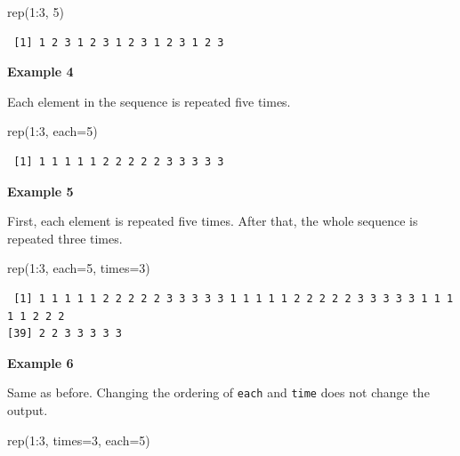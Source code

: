 \documentclass[
  letterpaper,
  DIV=11,
  numbers=noendperiod]{scrreprt}
\newenvironment{Shaded}{\begin{snugshade}}{\end{snugshade}}
\newcommand{\AttributeTok}[1]{\textcolor[rgb]{0.40,0.45,0.13}{#1}}
\newcommand{\DecValTok}[1]{\textcolor[rgb]{0.68,0.00,0.00}{#1}}
\newcommand{\FunctionTok}[1]{\textcolor[rgb]{0.28,0.35,0.67}{#1}}
\newcommand{\NormalTok}[1]{\textcolor[rgb]{0.00,0.23,0.31}{#1}}
\newcommand{\SpecialCharTok}[1]{\textcolor[rgb]{0.37,0.37,0.37}{#1}}
\begin{document}
\begin{Shaded}
\begin{Highlighting}[]
\FunctionTok{rep}\NormalTok{(}\DecValTok{1}\SpecialCharTok{:}\DecValTok{3}\NormalTok{, }\DecValTok{5}\NormalTok{)}
\end{Highlighting}
\end{Shaded}

\begin{verbatim}
 [1] 1 2 3 1 2 3 1 2 3 1 2 3 1 2 3
\end{verbatim}

\textbf{Example 4}

Each element in the sequence is repeated five times.

\begin{Shaded}
\begin{Highlighting}[]
\FunctionTok{rep}\NormalTok{(}\DecValTok{1}\SpecialCharTok{:}\DecValTok{3}\NormalTok{, }\AttributeTok{each=}\DecValTok{5}\NormalTok{)}
\end{Highlighting}
\end{Shaded}

\begin{verbatim}
 [1] 1 1 1 1 1 2 2 2 2 2 3 3 3 3 3
\end{verbatim}

\textbf{Example 5}

First, each element is repeated five times. After that, the whole
sequence is repeated three times.

\begin{Shaded}
\begin{Highlighting}[]
\FunctionTok{rep}\NormalTok{(}\DecValTok{1}\SpecialCharTok{:}\DecValTok{3}\NormalTok{, }\AttributeTok{each=}\DecValTok{5}\NormalTok{, }\AttributeTok{times=}\DecValTok{3}\NormalTok{)}
\end{Highlighting}
\end{Shaded}

\begin{verbatim}
 [1] 1 1 1 1 1 2 2 2 2 2 3 3 3 3 3 1 1 1 1 1 2 2 2 2 2 3 3 3 3 3 1 1 1 1 1 2 2 2
[39] 2 2 3 3 3 3 3
\end{verbatim}

\textbf{Example 6}

Same as before. Changing the ordering of \texttt{each} and \texttt{time}
does not change the output.

\begin{Shaded}
\begin{Highlighting}[]
\FunctionTok{rep}\NormalTok{(}\DecValTok{1}\SpecialCharTok{:}\DecValTok{3}\NormalTok{, }\AttributeTok{times=}\DecValTok{3}\NormalTok{, }\AttributeTok{each=}\DecValTok{5}\NormalTok{)}
\end{Highlighting}
\end{Shaded}
\end{document}

